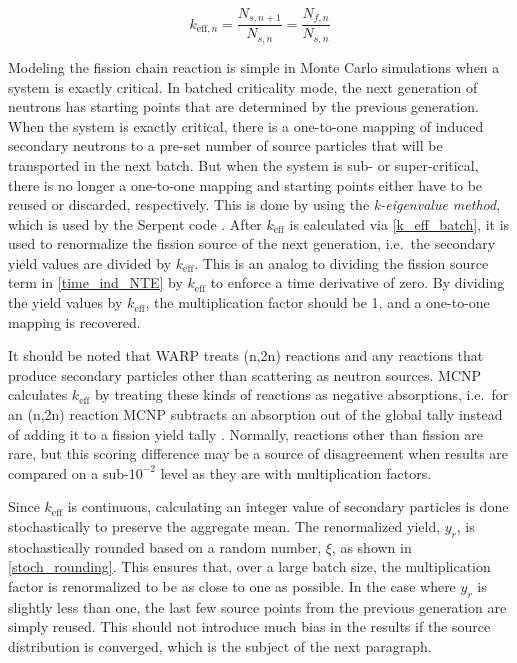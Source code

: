 \begin{equation}
\label{k_eff_batch}
k_{\mathrm{eff},n} = \frac{N_{s,n+1}}{N_{s,n}} = \frac{N_{f,n}}{N_{s,n}}
\end{equation}

Modeling the fission chain reaction is simple in Monte Carlo simulations when a system is exactly critical.  In batched criticality mode, the next generation of neutrons has starting points that are determined by the previous generation.  When the system is exactly critical, there is a one-to-one mapping of induced secondary neutrons to a pre-set number of source particles that will be transported in the next batch.  But when the system is sub- or super-critical, there is no longer a one-to-one mapping and starting points either have to be reused or discarded, respectively.  This is done by using the \emph{k-eigenvalue method}, which is used by the Serpent code \cite{jaakko}. %
 After $k_\mathrm{eff}$ is calculated via \eqref{k_eff_batch}, it is used to renormalize the fission source of the next generation, i.e.\ the secondary yield values are divided by $k_\mathrm{eff}$.  This is an analog to dividing the fission source term in \eqref{time_ind_NTE} by $k_\mathrm{eff}$ to enforce a time derivative of zero.  By dividing the yield values by $k_\mathrm{eff}$, the multiplication factor should be 1, and a one-to-one mapping is recovered.  
 
It should be noted that WARP treats (n,2n) reactions and any reactions that produce secondary particles other than scattering as neutron sources.  MCNP calculates $k_\mathrm{eff}$ by treating these kinds of reactions as negative absorptions, i.e.\ for an (n,2n) reaction MCNP subtracts an absorption out of the global tally instead of adding it to a fission yield tally \cite{mcnp}.  Normally, reactions other than fission are rare, but this scoring difference may be a source of disagreement when results are compared on a sub-$10^{-2}$ level as they are with multiplication factors.%

Since $k_\mathrm{eff}$ is continuous, calculating an integer value of secondary particles is done stochastically to preserve the aggregate mean.  The renormalized yield, $y_r$, is stochastically rounded based on a random number, $\xi$, as shown in  \eqref{stoch_rounding}.  This ensures that, over a large batch size, the multiplication factor is renormalized to be as close to one as possible.  In the case where $y_r$ is slightly less than one, the last few source points from the previous generation are simply reused. %
 This should not introduce much bias in the results if the source distribution is converged, which is the subject of the next paragraph.


